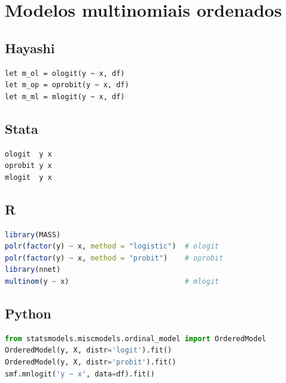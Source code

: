 \section{Modelos multinomiais ordenados}

\subsection*{Hayashi}

\begin{lstlisting}
let m_ol = ologit(y ~ x, df)
let m_op = oprobit(y ~ x, df)
let m_ml = mlogit(y ~ x, df)
\end{lstlisting}

\subsection*{Stata}

\begin{lstlisting}[language={}, basicstyle=\ttfamily\small,
  frame=single, numbers=none, backgroundcolor=\color{codbg}]
ologit  y x
oprobit y x
mlogit  y x
\end{lstlisting}

\subsection*{R}

\begin{lstlisting}[language=R, basicstyle=\ttfamily\small,
  frame=single, numbers=none, backgroundcolor=\color{codbg},
  keywordstyle=\color{keyword}\bfseries,
  stringstyle=\color{string},
  commentstyle=\color{comment}\itshape]
library(MASS)
polr(factor(y) ~ x, method = "logistic")  # ologit
polr(factor(y) ~ x, method = "probit")    # oprobit
library(nnet)
multinom(y ~ x)                           # mlogit
\end{lstlisting}

\subsection*{Python}

\begin{lstlisting}[language=Python, basicstyle=\ttfamily\small,
  frame=single, numbers=none, backgroundcolor=\color{codbg},
  keywordstyle=\color{keyword}\bfseries,
  stringstyle=\color{string},
  commentstyle=\color{comment}\itshape]
from statsmodels.miscmodels.ordinal_model import OrderedModel
OrderedModel(y, X, distr='logit').fit()
OrderedModel(y, X, distr='probit').fit()
smf.mnlogit('y ~ x', data=df).fit()
\end{lstlisting}

